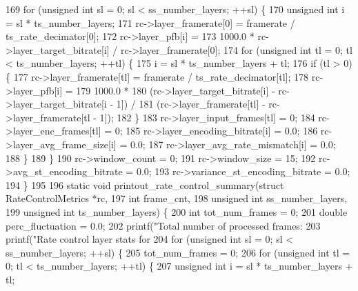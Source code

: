 \begin{DoxyCodeInclude}
169   \textcolor{keywordflow}{for} (\textcolor{keywordtype}{unsigned} \textcolor{keywordtype}{int} sl = 0; sl < ss\_number\_layers; ++sl) \{
170     \textcolor{keywordtype}{unsigned} \textcolor{keywordtype}{int} i = sl * ts\_number\_layers;
171     rc->layer\_framerate[0] = framerate / ts\_rate\_decimator[0];
172     rc->layer\_pfb[i] =
173         1000.0 * rc->layer\_target\_bitrate[i] / rc->layer\_framerate[0];
174     \textcolor{keywordflow}{for} (\textcolor{keywordtype}{unsigned} \textcolor{keywordtype}{int} tl = 0; tl < ts\_number\_layers; ++tl) \{
175       i = sl * ts\_number\_layers + tl;
176       \textcolor{keywordflow}{if} (tl > 0) \{
177         rc->layer\_framerate[tl] = framerate / ts\_rate\_decimator[tl];
178         rc->layer\_pfb[i] =
179             1000.0 *
180             (rc->layer\_target\_bitrate[i] - rc->layer\_target\_bitrate[i - 1]) /
181             (rc->layer\_framerate[tl] - rc->layer\_framerate[tl - 1]);
182       \}
183       rc->layer\_input\_frames[tl] = 0;
184       rc->layer\_enc\_frames[tl] = 0;
185       rc->layer\_encoding\_bitrate[i] = 0.0;
186       rc->layer\_avg\_frame\_size[i] = 0.0;
187       rc->layer\_avg\_rate\_mismatch[i] = 0.0;
188     \}
189   \}
190   rc->window\_count = 0;
191   rc->window\_size = 15;
192   rc->avg\_st\_encoding\_bitrate = 0.0;
193   rc->variance\_st\_encoding\_bitrate = 0.0;
194 \}
195 
196 \textcolor{keyword}{static} \textcolor{keywordtype}{void} printout\_rate\_control\_summary(\textcolor{keyword}{struct} RateControlMetrics *rc,
197                                           \textcolor{keywordtype}{int} frame\_cnt,
198                                           \textcolor{keywordtype}{unsigned} \textcolor{keywordtype}{int} ss\_number\_layers,
199                                           \textcolor{keywordtype}{unsigned} \textcolor{keywordtype}{int} ts\_number\_layers) \{
200   \textcolor{keywordtype}{int} tot\_num\_frames = 0;
201   \textcolor{keywordtype}{double} perc\_fluctuation = 0.0;
202   printf(\textcolor{stringliteral}{"Total number of processed frames: %
203   printf(\textcolor{stringliteral}{"Rate control layer stats for %
204   \textcolor{keywordflow}{for} (\textcolor{keywordtype}{unsigned} \textcolor{keywordtype}{int} sl = 0; sl < ss\_number\_layers; ++sl) \{
205     tot\_num\_frames = 0;
206     \textcolor{keywordflow}{for} (\textcolor{keywordtype}{unsigned} \textcolor{keywordtype}{int} tl = 0; tl < ts\_number\_layers; ++tl) \{
207       \textcolor{keywordtype}{unsigned} \textcolor{keywordtype}{int} i = sl * ts\_number\_layers + tl;
}}
\end{DoxyCodeInclude}

